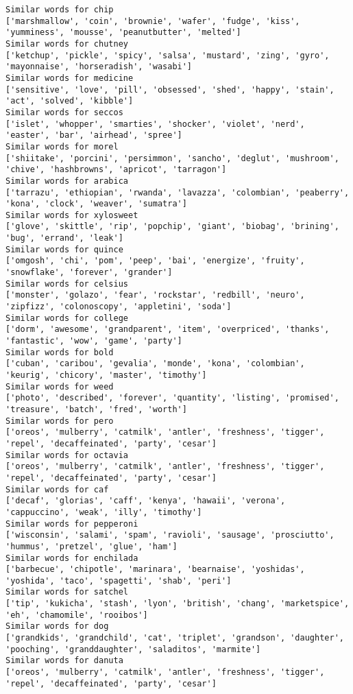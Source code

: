 \documentclass[11pt]{article}
\begin{document}
\begin{Verbatim}[commandchars=\\\{\}]
Similar words for chip
['marshmallow', 'coin', 'brownie', 'wafer', 'fudge', 'kiss', 'yumminess', 'mousse', 'peanutbutter', 'melted']
Similar words for chutney
['ketchup', 'pickle', 'spicy', 'salsa', 'mustard', 'zing', 'gyro', 'mayonnaise', 'horseradish', 'wasabi']
Similar words for medicine
['sensitive', 'love', 'pill', 'obsessed', 'shed', 'happy', 'stain', 'act', 'solved', 'kibble']
Similar words for seccos
['islet', 'whopper', 'smarties', 'shocker', 'violet', 'nerd', 'easter', 'bar', 'airhead', 'spree']
Similar words for morel
['shiitake', 'porcini', 'persimmon', 'sancho', 'deglut', 'mushroom', 'chive', 'hashbrowns', 'apricot', 'tarragon']
Similar words for arabica
['tarrazu', 'ethiopian', 'rwanda', 'lavazza', 'colombian', 'peaberry', 'kona', 'clock', 'weaver', 'sumatra']
Similar words for xylosweet
['glove', 'skittle', 'rip', 'popchip', 'giant', 'biobag', 'brining', 'bug', 'errand', 'leak']
Similar words for quince
['omgosh', 'chi', 'pom', 'peep', 'bai', 'energize', 'fruity', 'snowflake', 'forever', 'grander']
Similar words for celsius
['monster', 'golazo', 'fear', 'rockstar', 'redbill', 'neuro', 'zipfizz', 'colonoscopy', 'appletini', 'soda']
Similar words for college
['dorm', 'awesome', 'grandparent', 'item', 'overpriced', 'thanks', 'fantastic', 'wow', 'game', 'party']
Similar words for bold
['cuban', 'caribou', 'gevalia', 'monde', 'kona', 'colombian', 'keurig', 'chicory', 'master', 'timothy']
Similar words for weed
['photo', 'described', 'forever', 'quantity', 'listing', 'promised', 'treasure', 'batch', 'fred', 'worth']
Similar words for pero
['oreos', 'mulberry', 'catmilk', 'antler', 'freshness', 'tigger', 'repel', 'decaffeinated', 'party', 'cesar']
Similar words for octavia
['oreos', 'mulberry', 'catmilk', 'antler', 'freshness', 'tigger', 'repel', 'decaffeinated', 'party', 'cesar']
Similar words for caf
['decaf', 'glorias', 'caff', 'kenya', 'hawaii', 'verona', 'cappuccino', 'weak', 'illy', 'timothy']
Similar words for pepperoni
['wisconsin', 'salami', 'spam', 'ravioli', 'sausage', 'prosciutto', 'hummus', 'pretzel', 'glue', 'ham']
Similar words for enchilada
['barbecue', 'chipotle', 'marinara', 'bearnaise', 'yoshidas', 'yoshida', 'taco', 'spagetti', 'shab', 'peri']
Similar words for satchel
['tip', 'kukicha', 'stash', 'lyon', 'british', 'chang', 'marketspice', 'eh', 'chamomile', 'rooibos']
Similar words for dog
['grandkids', 'grandchild', 'cat', 'triplet', 'grandson', 'daughter', 'pooching', 'granddaughter', 'saladitos', 'marmite']
Similar words for danuta
['oreos', 'mulberry', 'catmilk', 'antler', 'freshness', 'tigger', 'repel', 'decaffeinated', 'party', 'cesar']

\end{Verbatim}
\end{document}
